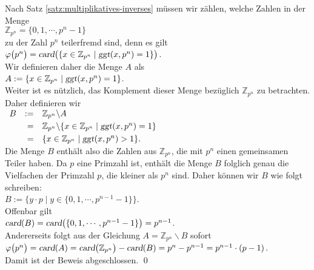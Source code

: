 \proof
Nach Satz \ref{satz:multiplikatives-inverses} müssen wir zählen, welche Zahlen in der Menge
\\[0.2cm]
\hspace*{1.3cm}
$\mathbb{Z}_{p^n} = \{0, 1, \cdots, p^n-1\}$ 
\\[0.2cm]
zu der Zahl $p^{n}$ teilerfremd sind, denn es gilt
\\[0.2cm]
\hspace*{1.3cm}
$\varphi\bigl(p^n\bigr) = 
 \textsl{card}\bigl(\{ x \in \mathbb{Z}_{p^n} \mid \textsl{ggt}(x, p^n) = 1 \}\bigr)
$.
\\[0.2cm]
Wir definieren daher die Menge $A$ als
\\[0.2cm]
\hspace*{1.3cm}
$A := \{ x \in \mathbb{Z}_{p^n} \mid \textsl{ggt}(x, p^n) = 1 \}$.
\
\\[0.2cm]
Weiter ist es nützlich, das Komplement dieser Menge bezüglich $\mathbb{Z}_{p^n}$ zu betrachten. Daher
definieren wir 
\\[-0.2cm]
\hspace*{1.3cm}
$
\begin{array}[t]{lrl}
B & := & \mathbb{Z}_{p^n} \backslash A \\[0.1cm]
  &  = & \mathbb{Z}_{p^n} \backslash \{ x \in \mathbb{Z}_{p^n} \mid \textsl{ggt}(x, p^n) = 1 \} \\[0.1cm]
  &  = & \{ x \in \mathbb{Z}_{p^n} \mid \textsl{ggt}(x, p^n) > 1 \}.
\end{array}
$
\\[0.2cm]
Die Menge $B$ enthält also die Zahlen aus $\mathbb{Z}_{p^n}$, die mit $p^n$ einen gemeinsamen Teiler
haben.  Da $p$ eine Primzahl ist, enthält die Menge $B$ folglich genau die Vielfachen  der Primzahl
$p$, die kleiner als $p^n$ sind.  Daher können wir $B$ wie folgt schreiben:
\\[0.2cm]
\hspace*{1.3cm}
$B := \bigl\{ y \cdot p \mid y \in \{ 0, 1, \cdots, p^{n-1} - 1\} \bigr\}$.
\\[0.2cm]
Offenbar gilt
\\[0.2cm]
\hspace*{1.3cm}
$\textsl{card}(B) = \textsl{card}\bigl(\{ 0, 1, \cdots, p^{n-1} - 1\}\bigr) = p^{n-1}$.
\\[0.2cm]
Andererseits folgt aus der Gleichung $A = \mathbb{Z}_{p^n} \backslash B$ sofort
\\[0.2cm]
\hspace*{1.3cm}
$\varphi\bigl(p^n\bigr) = \textsl{card}(A) = \textsl{card}\bigl(\mathbb{Z}_{p^n}\bigr) - \textsl{card}(B)
                  = p^n - p^{n-1} = p^{n-1} \cdot (p - 1)$.
\\[0.2cm]
Damit ist der Beweis abgeschlossen. \qed
\vspace*{0.3cm}

